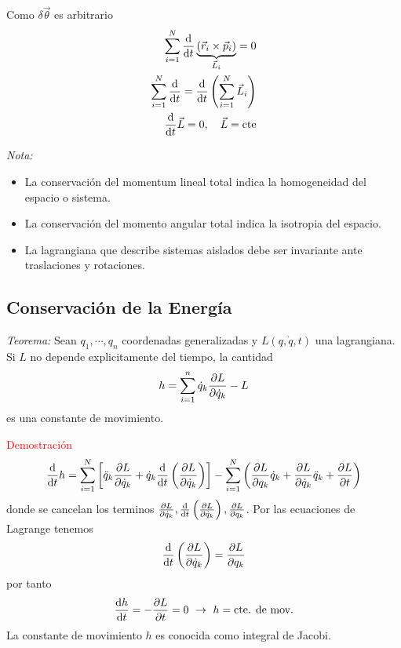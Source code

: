 \documentclass[../main]{subfiles}
\begin{document}
Como $\delta\vec{\theta}$ es arbitrario
\begin{equation}
    \begin{split}
        \sum_{i=1}^N \dv{}{t}\underbrace{(\vec{r}_i \times \vec{p}_i)}_{\vec{L}_i}=0\\
        \sum_{i=1}^N \dv{}{t}(\vec{L}_i)=\dv{}{t}\left(\sum_{i=1}^N \vec{L}_i\right)\\
        \dv{}{t}\vec{L}=0, \quad \vec{L}=\text{cte}
    \end{split}
\end{equation}

\textit{Nota:}
\begin{itemize}
    \item La conservación del momentum lineal total indica la homogeneidad del espacio o sistema.
    \item La conservación del momento angular total indica la isotropia del espacio.
    \item La lagrangiana que describe sistemas aislados debe ser invariante ante traslaciones y rotaciones.
\end{itemize}

\subsection{Conservación de la Energía}
\textit{Teorema:} Sean $q_1, \cdots, q_n$ coordenadas generalizadas y $L(q, \dot{q}, t)$ una lagrangiana. Si $L$ no depende explicitamente del tiempo, la cantidad 
\begin{equation}
    h=\sum_{i=1}^n \dot{q}_k \pdv{L}{\dot{q}_k}-L
\end{equation}
es una constante de movimiento.

\textcolor{red}{Demostración}
\begin{equation}
    \dv{}{t}h=\sum_{i=1}^N \left[\ddot{q}_k \pdv{L}{\dot{q}_k}+\dot{q}_k\dv{}{t}\left(\pdv{L}{\dot{q}_k}\right)\right]-\sum_{i=1}^N \left(\pdv{L}{q_k}\dot{q}_k+\pdv{L}{\dot{q}_k}\ddot{q}_k+\pdv{L}{t}\right)
\end{equation}
donde se cancelan los terminos $\pdv{L}{\dot{q}_k}, \dv{}{t}\left(\pdv{L}{\dot{q}_k}\right), \pdv{L}{q_k}$. Por las ecuaciones de Lagrange tenemos 
\begin{equation}
    \dv{}{t}\left(\pdv{L}{\dot{q}_k}\right)=\pdv{L}{q_k}
\end{equation}
por tanto
\begin{equation}
    \dv{h}{t}=-\pdv{L}{t}=0 \ \rightarrow \ h=\text{cte. de mov.}
\end{equation}
La constante de movimiento $h$ es conocida como integral de Jacobi.
\end{document}
